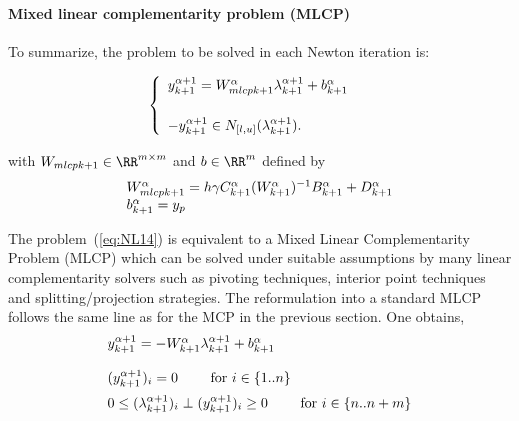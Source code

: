 \paragraph{Mixed linear complementarity problem (MLCP)}To summarize, the problem to be solved in each Newton iteration is:\\{
  \begin{minipage}[l]{1.0\linewidth}
    \begin{equation}
      \begin{cases}
      \begin{array}[l]{l}
        y^{\alpha+1}_{k+1} =   W_{mlcpk+1}^{\alpha}  \lambda^{\alpha+1}_{k+1} + b^{\alpha}_{k+1}
        \\ \\
        -y^{\alpha+1}_{k+1} \in N_{[l,u]}(\lambda^{\alpha+1}_{k+1} ). 
      \end{array}
      \label{eq:NL14}
      \end{cases}
    \end{equation}
  \end{minipage}
}
with $W_{mlcpk+1}\in \RR^{m\times m}$ and $b\in\RR^{m}$ defined by
\begin{equation}
  \label{eq:NL15}
 \begin{array}[l]{l}
   W_{mlcpk+1}^{\alpha} = h \gamma C^{\alpha}_{k+1}  (W^{\alpha}_{k+1})^{-1}  B^{\alpha}_{k+1} + D^{\alpha}_{k+1} \\
   b^{\alpha}_{k+1} = y_p
\end{array}
\end{equation}

The problem~(\ref{eq:NL14}) is equivalent to a Mixed Linear Complementarity Problem (MLCP) which can be solved under suitable assumptions by many linear complementarity solvers such as pivoting techniques, interior point techniques and splitting/projection strategies. The  reformulation into a standard MLCP follows the same line as for the MCP in the previous section. One obtains,
    \begin{equation}
      \begin{array}[l]{l}
        y^{\alpha+1}_{k+1} =   - W^{\alpha}_{k+1}  \lambda^{\alpha+1}_{k+1} + b^{\alpha}_{k+1}
        \\ \\
        (y^{\alpha+1}_{k+1})_i  = 0 \qquad \textrm{ for } i \in \{ 1..n\}\\[2mm]
        0 \leq  (\lambda^{\alpha+1}_{k+1})_i\perp (y^{\alpha+1}_{k+1})_i \geq 0 \qquad \textrm{ for } i \in \{ n..n+m\}\\
      \end{array}
      \label{eq:MLCP1} 
    \end{equation}




